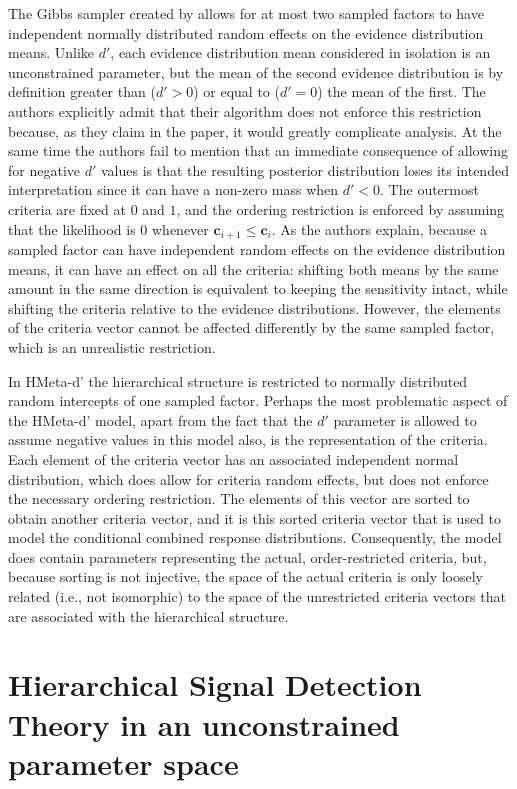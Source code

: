 \documentclass[a4paper,man,apacite,floatsintext]{apa6}
\begin{document}
The Gibbs sampler created by  allows for
at most two sampled factors to have independent normally distributed
random effects on the evidence distribution means. Unlike $d'$, each
evidence distribution mean considered in isolation is an unconstrained
parameter, but the mean of the second evidence distribution is by
definition greater than ($d' > 0$) or equal to ($d' = 0$) the mean of
the first. The authors explicitly admit that their algorithm does not
enforce this restriction because, as they claim in the paper, it would
greatly complicate analysis. At the same time the authors fail to
mention that an immediate consequence of allowing for negative $d'$
values is that the resulting posterior distribution loses its intended
interpretation since it can have a non-zero mass when $d' < 0$. The
outermost criteria are fixed at $0$ and $1$, and the ordering
restriction is enforced by assuming that the likelihood is $0$
whenever $\bm{c}_{i+1} \leq \bm{c}_i$. As the authors explain, because
a sampled factor can have independent random effects on the evidence
distribution means, it can have an effect on all the criteria:
shifting both means by the same amount in the same direction is
equivalent to keeping the sensitivity intact, while shifting the
criteria relative to the evidence distributions. However, the elements
of the criteria vector cannot be affected differently by the same
sampled factor, which is an unrealistic restriction.

In HMeta-d' the hierarchical structure is restricted to normally
distributed random intercepts of one sampled factor. Perhaps the most
problematic aspect of the HMeta-d' model, apart from the fact that the
$d'$ parameter is allowed to assume negative values in this model
also, is the representation of the criteria. Each element of the
criteria vector has an associated independent normal distribution,
which does allow for criteria random effects, but does not enforce the
necessary ordering restriction. The elements of this vector are sorted
to obtain another criteria vector, and it is this sorted criteria
vector that is used to model the conditional combined response
distributions. Consequently, the model does contain parameters
representing the actual, order-restricted criteria, but, because
sorting is not injective, the space of the actual criteria is only
loosely related (i.e., not isomorphic) to the space of the
unrestricted criteria vectors that are associated with the
hierarchical structure.

\section{Hierarchical Signal Detection Theory in an unconstrained
  parameter space}
\end{document}

